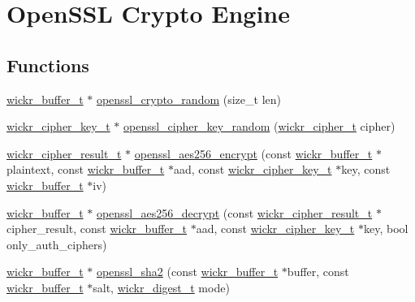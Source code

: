 \hypertarget{group__openssl__crypto}{}\section{Open\+S\+SL Crypto Engine}
\label{group__openssl__crypto}
\subsection*{Functions}
\begin{DoxyCompactItemize}
\item 
\mbox{\hyperlink{structwickr__buffer}{wickr\+\_\+buffer\+\_\+t}} $\ast$ \mbox{\hyperlink{group__openssl__crypto_gadfe740d19f9f2096b818553e90dae0d7}{openssl\+\_\+crypto\+\_\+random}} (size\+\_\+t len)
\item 
\mbox{\hyperlink{structwickr__cipher__key}{wickr\+\_\+cipher\+\_\+key\+\_\+t}} $\ast$ \mbox{\hyperlink{group__openssl__crypto_ga9177055e488f0163d3eb946799df5a67}{openssl\+\_\+cipher\+\_\+key\+\_\+random}} (\mbox{\hyperlink{structwickr__cipher}{wickr\+\_\+cipher\+\_\+t}} cipher)
\item 
\mbox{\hyperlink{structwickr__cipher__result}{wickr\+\_\+cipher\+\_\+result\+\_\+t}} $\ast$ \mbox{\hyperlink{group__openssl__crypto_gaf51493d43d3572265abba27e2b3fbc54}{openssl\+\_\+aes256\+\_\+encrypt}} (const \mbox{\hyperlink{structwickr__buffer}{wickr\+\_\+buffer\+\_\+t}} $\ast$plaintext, const \mbox{\hyperlink{structwickr__buffer}{wickr\+\_\+buffer\+\_\+t}} $\ast$aad, const \mbox{\hyperlink{structwickr__cipher__key}{wickr\+\_\+cipher\+\_\+key\+\_\+t}} $\ast$key, const \mbox{\hyperlink{structwickr__buffer}{wickr\+\_\+buffer\+\_\+t}} $\ast$iv)
\item 
\mbox{\hyperlink{structwickr__buffer}{wickr\+\_\+buffer\+\_\+t}} $\ast$ \mbox{\hyperlink{group__openssl__crypto_ga75eaf118b28fb76e75579d0a74517b18}{openssl\+\_\+aes256\+\_\+decrypt}} (const \mbox{\hyperlink{structwickr__cipher__result}{wickr\+\_\+cipher\+\_\+result\+\_\+t}} $\ast$cipher\+\_\+result, const \mbox{\hyperlink{structwickr__buffer}{wickr\+\_\+buffer\+\_\+t}} $\ast$aad, const \mbox{\hyperlink{structwickr__cipher__key}{wickr\+\_\+cipher\+\_\+key\+\_\+t}} $\ast$key, bool only\+\_\+auth\+\_\+ciphers)
\item 
\mbox{\hyperlink{structwickr__buffer}{wickr\+\_\+buffer\+\_\+t}} $\ast$ \mbox{\hyperlink{group__openssl__crypto_ga19991a9b00d0c383c64935fa2acecda7}{openssl\+\_\+sha2}} (const \mbox{\hyperlink{structwickr__buffer}{wickr\+\_\+buffer\+\_\+t}} $\ast$buffer, const \mbox{\hyperlink{structwickr__buffer}{wickr\+\_\+buffer\+\_\+t}} $\ast$salt, \mbox{\hyperlink{structwickr__digest}{wickr\+\_\+digest\+\_\+t}} mode)

\end{DoxyCompactItemize}
